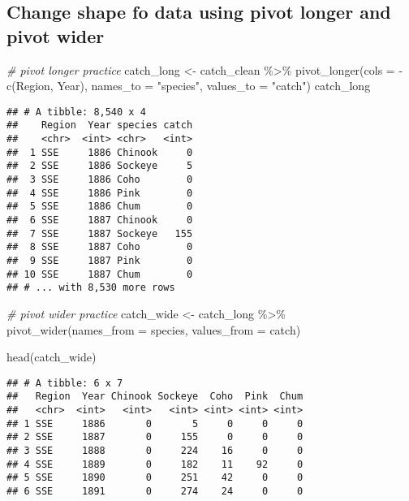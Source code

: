\documentclass[
]{article}
\newenvironment{Shaded}{\begin{snugshade}}{\end{snugshade}}
\newcommand{\AttributeTok}[1]{\textcolor[rgb]{0.77,0.63,0.00}{#1}}
\newcommand{\CommentTok}[1]{\textcolor[rgb]{0.56,0.35,0.01}{\textit{#1}}}
\newcommand{\FunctionTok}[1]{\textcolor[rgb]{0.00,0.00,0.00}{#1}}
\newcommand{\NormalTok}[1]{#1}
\newcommand{\OtherTok}[1]{\textcolor[rgb]{0.56,0.35,0.01}{#1}}
\newcommand{\SpecialCharTok}[1]{\textcolor[rgb]{0.00,0.00,0.00}{#1}}
\newcommand{\StringTok}[1]{\textcolor[rgb]{0.31,0.60,0.02}{#1}}
\begin{document}
\hypertarget{change-shape-fo-data-using-pivot-longer-and-pivot-wider}{%
\subsection{Change shape fo data using pivot longer and pivot
wider}\label{change-shape-fo-data-using-pivot-longer-and-pivot-wider}}

\begin{Shaded}
\begin{Highlighting}[]
\CommentTok{\# pivot longer practice}
\NormalTok{catch\_long }\OtherTok{\textless{}{-}}\NormalTok{ catch\_clean }\SpecialCharTok{\%\textgreater{}\%}
  \FunctionTok{pivot\_longer}\NormalTok{(}\AttributeTok{cols =} \SpecialCharTok{{-}}\FunctionTok{c}\NormalTok{(Region, Year), }\AttributeTok{names\_to =} \StringTok{"species"}\NormalTok{, }\AttributeTok{values\_to =} \StringTok{"catch"}\NormalTok{)}
\NormalTok{catch\_long}
\end{Highlighting}
\end{Shaded}

\begin{verbatim}
## # A tibble: 8,540 x 4
##    Region  Year species catch
##    <chr>  <int> <chr>   <int>
##  1 SSE     1886 Chinook     0
##  2 SSE     1886 Sockeye     5
##  3 SSE     1886 Coho        0
##  4 SSE     1886 Pink        0
##  5 SSE     1886 Chum        0
##  6 SSE     1887 Chinook     0
##  7 SSE     1887 Sockeye   155
##  8 SSE     1887 Coho        0
##  9 SSE     1887 Pink        0
## 10 SSE     1887 Chum        0
## # ... with 8,530 more rows
\end{verbatim}

\begin{Shaded}
\begin{Highlighting}[]
\CommentTok{\# pivot wider practice}
\NormalTok{catch\_wide }\OtherTok{\textless{}{-}}\NormalTok{ catch\_long }\SpecialCharTok{\%\textgreater{}\%} 
  \FunctionTok{pivot\_wider}\NormalTok{(}\AttributeTok{names\_from =}\NormalTok{ species, }\AttributeTok{values\_from =}\NormalTok{ catch)}

\FunctionTok{head}\NormalTok{(catch\_wide)}
\end{Highlighting}
\end{Shaded}

\begin{verbatim}
## # A tibble: 6 x 7
##   Region  Year Chinook Sockeye  Coho  Pink  Chum
##   <chr>  <int>   <int>   <int> <int> <int> <int>
## 1 SSE     1886       0       5     0     0     0
## 2 SSE     1887       0     155     0     0     0
## 3 SSE     1888       0     224    16     0     0
## 4 SSE     1889       0     182    11    92     0
## 5 SSE     1890       0     251    42     0     0
## 6 SSE     1891       0     274    24     0     0
\end{verbatim}
\end{document}
